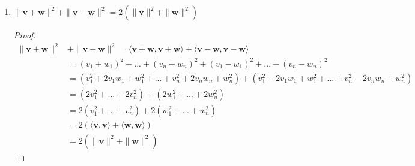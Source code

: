\documentclass{tufte-book}
\theoremstyle{mytheoremstyle}
\theoremstyle{mylemstyle}
\theoremstyle{mydefstyle}
\begin{document}
\begin{enumerate}
\item $\|\mathbf{v} + \mathbf{w} \|^2 + \|\mathbf{v} -\mathbf{w}\|^2 = 2(\|\mathbf{v}\|^2 + \|\mathbf{w}\|^2)$
\begin{proof}
\begin{align*}
\|\mathbf{v} + \mathbf{w} \|^2 &+ \|\mathbf{v} -\mathbf{w}\|^2 =
  \langle \mathbf{v} + \mathbf{w},\mathbf{v} + \mathbf{w}\rangle +
  \langle \mathbf{v} - \mathbf{w},\mathbf{v} - \mathbf{w}\rangle \\
&= (v_1 +w_1)^2 + ... + (v_n+w_n)^2 + (v_1-w_1)^2 + ... + (v_n-w_n)^2\\
&= (v_1^2 + 2v_1w_1 + w_1^2 +...+v_n^2 + 2v_nw_n + w_n^2) + (v_1^2 - 2v_1w_1 + w_1^2 +...+v_n^2 - 2v_nw_n + w_n^2) \\
&= (2v_1^2 +...+2v_n^2) + (2w_1^2 +...+ 2w_n^2)\\
&= 2(v_1^2 +...+v_n^2) + 2(w_1^2 +...+w_n^2) \\
&= 2(\langle\mathbf{v},\mathbf{v}\rangle + \langle\mathbf{w},\mathbf{w}\rangle)\\
&= 2(\|\mathbf{v}\|^2 + \|\mathbf{w}\|^2)
\end{align*}
\end{proof}
\end{enumerate}
\end{document}
